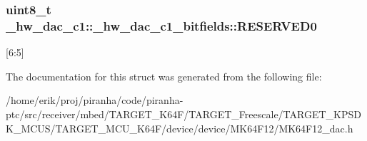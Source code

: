 \subsubsection[{\texorpdfstring{R\+E\+S\+E\+R\+V\+E\+D0}{RESERVED0}}]{\setlength{\rightskip}{0pt plus 5cm}uint8\+\_\+t \+\_\+hw\+\_\+dac\+\_\+c1\+::\+\_\+hw\+\_\+dac\+\_\+c1\+\_\+bitfields\+::\+R\+E\+S\+E\+R\+V\+E\+D0}\hypertarget{struct__hw__dac__c1_1_1__hw__dac__c1__bitfields_a9eebbaa5f274c9af97a8928035d8f177}{}\label{struct__hw__dac__c1_1_1__hw__dac__c1__bitfields_a9eebbaa5f274c9af97a8928035d8f177}
\mbox{[}6\+:5\mbox{]} 

The documentation for this struct was generated from the following file\+:\begin{DoxyCompactItemize}
\item 
/home/erik/proj/piranha/code/piranha-\/ptc/src/receiver/mbed/\+T\+A\+R\+G\+E\+T\+\_\+\+K64\+F/\+T\+A\+R\+G\+E\+T\+\_\+\+Freescale/\+T\+A\+R\+G\+E\+T\+\_\+\+K\+P\+S\+D\+K\+\_\+\+M\+C\+U\+S/\+T\+A\+R\+G\+E\+T\+\_\+\+M\+C\+U\+\_\+\+K64\+F/device/device/\+M\+K64\+F12/M\+K64\+F12\+\_\+dac.\+h\end{DoxyCompactItemize}
